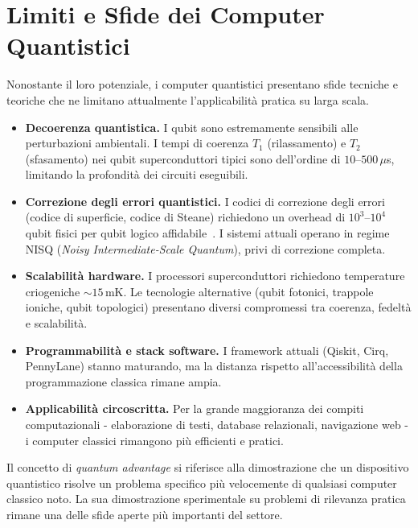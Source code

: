 \section{Limiti e Sfide dei Computer Quantistici}
\label{sec:limiti}

Nonostante il loro potenziale, i computer quantistici presentano sfide tecniche
e teoriche che ne limitano attualmente l'applicabilità pratica su larga scala.

\begin{itemize}
  \item \textbf{Decoerenza quantistica.}
    I qubit sono estremamente sensibili alle perturbazioni ambientali. I tempi di
    coerenza $T_1$ (rilassamento) e $T_2$ (sfasamento) nei qubit superconduttori
    tipici sono dell'ordine di $10$--$500\,\mu$s, limitando la profondità dei
    circuiti eseguibili.

  \item \textbf{Correzione degli errori quantistici.}
    I codici di correzione degli errori (codice di superficie, codice di Steane)
    richiedono un overhead di $10^3$--$10^4$ qubit fisici per qubit logico
    affidabile~\cite{preskill2018quantum}. I sistemi attuali operano in regime
    NISQ (\textit{Noisy Intermediate-Scale Quantum}), privi di correzione
    completa.

  \item \textbf{Scalabilità hardware.}
    I processori superconduttori richiedono temperature criogeniche $\sim
    15\,\text{mK}$. Le tecnologie alternative (qubit fotonici, trappole ioniche,
    qubit topologici) presentano diversi compromessi tra coerenza, fedeltà e
    scalabilità.

  \item \textbf{Programmabilità e stack software.}
    I framework attuali (Qiskit, Cirq, PennyLane) stanno maturando, ma la
    distanza rispetto all'accessibilità della programmazione classica rimane ampia.

  \item \textbf{Applicabilità circoscritta.}
    Per la grande maggioranza dei compiti computazionali - elaborazione di testi,
    database relazionali, navigazione web - i computer classici rimangono più
    efficienti e pratici.
\end{itemize}

\begin{notabox}
  Il concetto di \textit{quantum advantage} si riferisce alla dimostrazione che
  un dispositivo quantistico risolve un problema specifico più velocemente di
  qualsiasi computer classico noto. La sua dimostrazione sperimentale su problemi
  di rilevanza pratica rimane una delle sfide aperte più importanti del settore.
\end{notabox}

